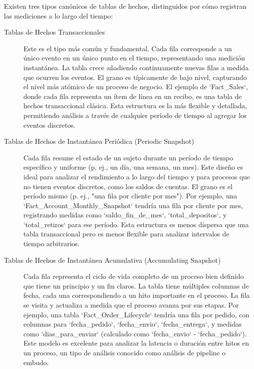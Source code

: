 \documentclass{article}
\begin{document}
Existen tres tipos canónicos de tablas de hechos, distinguidos por cómo registran las mediciones a lo largo del tiempo:
\begin{description}
    \item[Tablas de Hechos Transaccionales] Este es el tipo más común y fundamental. Cada fila corresponde a un único evento en un único punto en el tiempo, representando una medición instantánea. La tabla crece añadiendo continuamente nuevas filas a medida que ocurren los eventos. El grano es típicamente de bajo nivel, capturando el nivel más atómico de un proceso de negocio. El ejemplo de `Fact_Sales`, donde cada fila representa un ítem de línea en un recibo, es una tabla de hechos transaccional clásica. Esta estructura es la más flexible y detallada, permitiendo análisis a través de cualquier período de tiempo al agregar los eventos discretos.

    \item[Tablas de Hechos de Instantánea Periódica (Periodic Snapshot)] Cada fila resume el estado de un sujeto durante un período de tiempo específico y uniforme (p. ej., un día, una semana, un mes). Este diseño es ideal para analizar el rendimiento a lo largo del tiempo y para procesos que no tienen eventos discretos, como los saldos de cuentas. El grano es el período mismo (p. ej., "una fila por cliente por mes"). Por ejemplo, una `Fact_Account_Monthly_Snapshot` tendría una fila por cliente por mes, registrando medidas como `saldo_fin_de_mes`, `total_depositos`, y `total_retiros` para ese período. Esta estructura es menos dispersa que una tabla transaccional pero es menos flexible para analizar intervalos de tiempo arbitrarios.

    \item[Tablas de Hechos de Instantánea Acumulativa (Accumulating Snapshot)] Cada fila representa el ciclo de vida completo de un proceso bien definido que tiene un principio y un fin claros. La tabla tiene múltiples columnas de fecha, cada una correspondiendo a un hito importante en el proceso. La fila se visita y actualiza a medida que el proceso avanza por sus etapas. Por ejemplo, una tabla `Fact_Order_Lifecycle` tendría una fila por pedido, con columnas para `fecha_pedido`, `fecha_envio`, `fecha_entrega`, y medidas como `dias_para_enviar` (calculado como `fecha_envio` - `fecha_pedido`). Este modelo es excelente para analizar la latencia o duración entre hitos en un proceso, un tipo de análisis conocido como análisis de pipeline o embudo.
\end{description}
\end{document}
